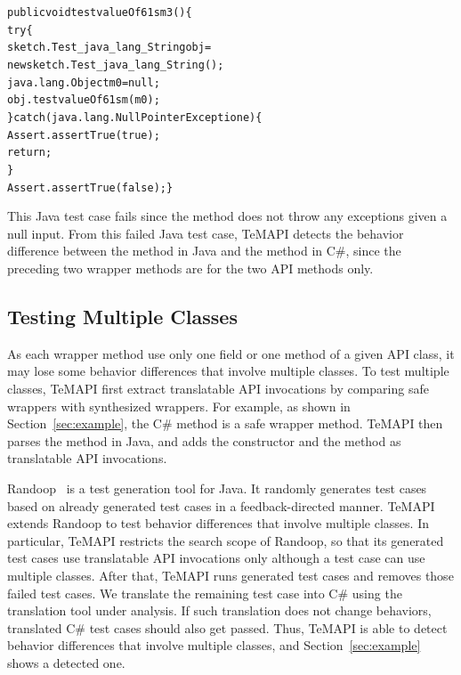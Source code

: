 \begin{CodeOut}\vspace*{-1ex}
\begin{alltt}
 public void testvalueOf61sm3()\{
   try\{
     sketch.Test_java_lang_String obj =
           new sketch.Test_java_lang_String();
     java.lang.Object m0 = null;
     obj.testvalueOf61sm(m0);
   \}catch(java.lang.NullPointerException e)\{
     Assert.assertTrue(true);
     return;
   \}
   Assert.assertTrue(false); \}
\end{alltt}
\end{CodeOut}\vspace*{-1ex}

This Java test case fails since the  method does not throw any exceptions given a null input.
From this failed Java test case, TeMAPI detects the behavior difference between the  method in Java and the  method in C\#, since the preceding two wrapper methods are for the two API methods only.

\subsection{Testing Multiple Classes}
\label{sec:approach:sequence}
As each wrapper method use only one field or one method of a given API class, it may lose some behavior differences that involve multiple classes. To test multiple classes, TeMAPI first extract translatable API invocations by comparing safe wrappers with synthesized wrappers. For example, as shown in Section~\ref{sec:example}, the C\#  method is a safe wrapper method. TeMAPI then parses the  method in Java, and adds the  constructor and the  method as translatable API invocations.

Randoop~\cite{pacheco2007feedback} is a test generation tool for Java. It randomly generates test cases based on already generated test cases in a feedback-directed manner. TeMAPI extends Randoop to test behavior differences that involve multiple classes. In particular, TeMAPI restricts the search scope of Randoop, so that its generated test cases use translatable API invocations only although a test case can use multiple classes. After that, TeMAPI runs generated test cases and removes those failed test cases. We translate the remaining test case into C\# using the translation tool under analysis. If such translation does not change behaviors, translated C\# test cases should also get passed. Thus, TeMAPI is able to detect behavior differences that involve multiple classes, and Section~\ref{sec:example} shows a detected one.
 

